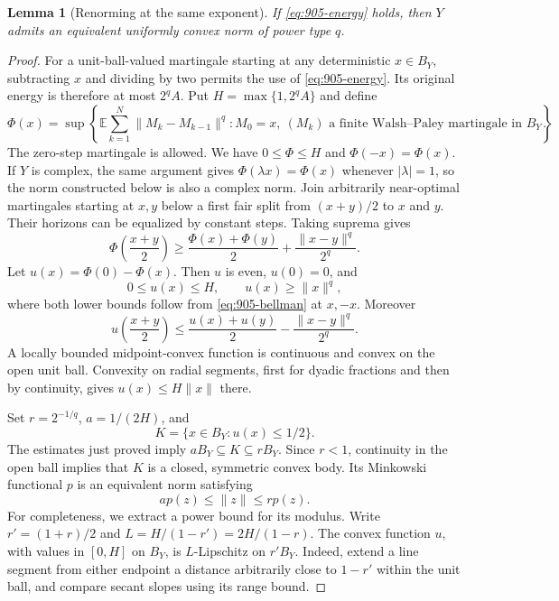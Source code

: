 \documentclass[11pt,a4paper]{article}
\newtheorem{lemma}[theorem]{Lemma}
\theoremstyle{remark}
\begin{document}
\begin{lemma}[Renorming at the same exponent]\label{lem:905-renorm}
If \eqref{eq:905-energy} holds, then $Y$ admits an equivalent uniformly
convex norm of power type $q$.
\end{lemma}
\begin{proof}
For a unit-ball-valued martingale starting at any deterministic
$x\in B_Y$, subtracting $x$ and dividing by two permits the use of
\eqref{eq:905-energy}.  Its original energy is therefore at most
$2^qA$.  Put $H=\max\{1,2^qA\}$ and define
\[
 \Phi(x)=\sup\left\{\mathbb E\sum_{k=1}^N
 \|M_k-M_{k-1}\|^q:
 M_0=x,\ (M_k)\text{ a finite Walsh--Paley martingale in }B_Y\right\}.
\]
The zero-step martingale is allowed.  We have $0\leq\Phi\leq H$ and
$\Phi(-x)=\Phi(x)$.  If $Y$ is complex, the same argument gives
$\Phi(\lambda x)=\Phi(x)$ whenever $|\lambda|=1$, so the norm
constructed below is also a complex norm.  Join arbitrarily near-optimal martingales starting
at $x,y$ below a first fair split from $(x+y)/2$ to $x$ and $y$.
Their horizons can be equalized by constant steps.  Taking suprema gives
\begin{equation}\label{eq:905-bellman}
 \Phi\left(\frac{x+y}{2}\right)
 \geq\frac{\Phi(x)+\Phi(y)}2+\frac{\|x-y\|^q}{2^q}.
\end{equation}
Let $u(x)=\Phi(0)-\Phi(x)$.  Then $u$ is even, $u(0)=0$, and
\[
 0\leq u(x)\leq H,\qquad u(x)\geq\|x\|^q,
\]
where both lower bounds follow from \eqref{eq:905-bellman} at $x,-x$.
Moreover
\begin{equation}\label{eq:905-strong-convexity}
 u\left(\frac{x+y}{2}\right)
 \leq\frac{u(x)+u(y)}2-\frac{\|x-y\|^q}{2^q}.
\end{equation}
A locally bounded midpoint-convex function is continuous and convex
on the open unit ball.  Convexity on radial segments, first for dyadic
fractions and then by continuity, gives $u(x)\leq H\|x\|$ there.

Set $r=2^{-1/q}$, $a=1/(2H)$, and
\[
 K=\{x\in B_Y:u(x)\leq1/2\}.
\]
The estimates just proved imply $aB_Y\subseteq K\subseteq rB_Y$.
Since $r<1$, continuity in the open ball implies that $K$ is a closed,
symmetric convex body.  Its Minkowski functional $p$ is an equivalent
norm satisfying
\begin{equation}\label{eq:905-norm-comparison}
 a p(z)\leq\|z\|\leq r p(z).
\end{equation}
For completeness, we extract a power bound for its modulus.
Write $r'=(1+r)/2$ and $L=H/(1-r')=2H/(1-r)$.
The convex function $u$, with values in $[0,H]$ on $B_Y$, is
$L$-Lipschitz on $r'B_Y$.  Indeed, extend a line segment from either
endpoint a distance arbitrarily close to $1-r'$ within the unit ball,
and compare secant slopes using its range bound.


\end{proof}
\end{document}
